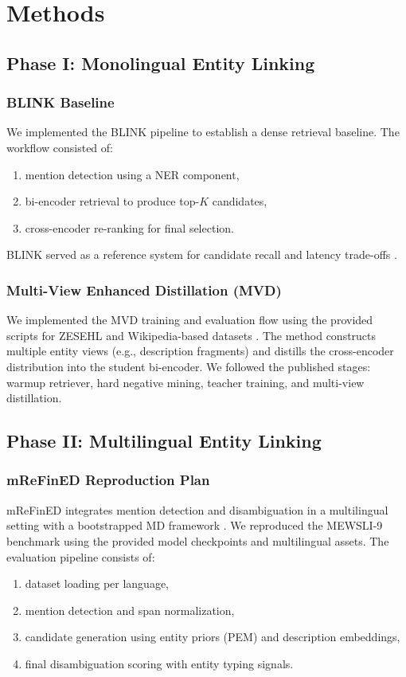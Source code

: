 \chapter{Methods}
\label{ch:methods}

\section{Phase I: Monolingual Entity Linking}
\subsection{BLINK Baseline}
We implemented the BLINK pipeline to establish a dense retrieval baseline. The workflow consisted of:
\begin{enumerate}
    \item mention detection using a NER component,
    \item bi-encoder retrieval to produce top-$K$ candidates,
    \item cross-encoder re-ranking for final selection.
\end{enumerate}
BLINK served as a reference system for candidate recall and latency trade-offs \cite{wu2020blink}.

\subsection{Multi-View Enhanced Distillation (MVD)}
We implemented the MVD training and evaluation flow using the provided scripts for ZESEHL and Wikipedia-based datasets \cite{mvd2023}. The method constructs multiple entity views (e.g., description fragments) and distills the cross-encoder distribution into the student bi-encoder. We followed the published stages: warmup retriever, hard negative mining, teacher training, and multi-view distillation.

\section{Phase II: Multilingual Entity Linking}
\subsection{mReFinED Reproduction Plan}
mReFinED integrates mention detection and disambiguation in a multilingual setting with a bootstrapped MD framework \cite{mrefined2023}. We reproduced the MEWSLI-9 benchmark using the provided model checkpoints and multilingual assets. The evaluation pipeline consists of:
\begin{enumerate}
    \item dataset loading per language,
    \item mention detection and span normalization,
    \item candidate generation using entity priors (PEM) and description embeddings,
    \item final disambiguation scoring with entity typing signals.
\end{enumerate}

